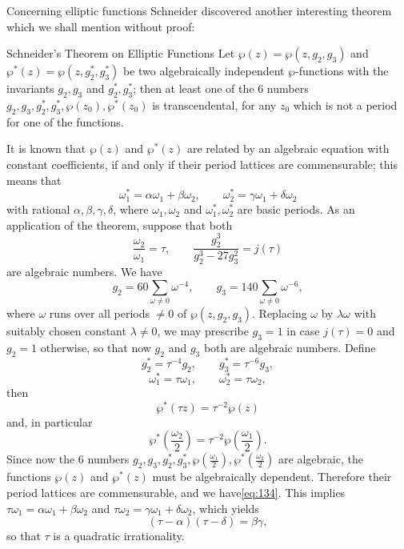 Concerning elliptic functions Schneider discovered another interesting theorem which we shall mention without proof:

\begin{mythm*}{Schneider's Theorem on Elliptic Functions}
Let $\wp(z) = \wp(z, g_2, g_3)$ and $\wp^*(z) = \wp(z, g_2^*, g_3^*)$ be two algebraically independent $\wp$-functions with the invariants $g_2, g_3$ and $g_2^*, g_3^*$; then at least one of the 6 numbers $g_2, g_3, g_2^*, g_3^*, \wp(z_0), \wp^*(z_0)$ is transcendental, for any $z_0$ which is not a period for one of the functions.
\end{mythm*}

It is known that $\wp(z)$ and $\wp^*(z)$ are related by an algebraic equation with constant coefficients, if and only if their period lattices are commensurable; this means that
\begin{equation}
\omega_1^* = \alpha \omega_1 + \beta \omega_2, \qquad \omega_2^* = \gamma \omega_1 + \delta \omega_2 \tag{134}\label{eq:134}
\end{equation}
with rational $\alpha, \beta, \gamma, \delta$, where $\omega_1, \omega_2$ and $\omega_1^*, \omega_2^*$ are basic periods. As an application of the theorem, suppose that both
\[
\frac{\omega_2}{\omega_1} = \tau, \qquad \frac{g_2^3}{g_2^3 - 27g_3^2} = j(\tau)
\]
are algebraic numbers. We have
\[
g_2 = 60 \sum_{\omega \neq 0} \omega^{-4}, \qquad g_3 = 140 \sum_{\omega \neq 0} \omega^{-6},
\]
where $\omega$ runs over all periods $\neq 0$ of $\wp(z, g_2, g_3)$. Replacing $\omega$ by $\lambda\omega$ with suitably chosen constant $\lambda \neq 0$, we may prescribe $g_3=1$ in case $j(\tau)=0$ and $g_2=1$ otherwise, so that now $g_2$ and $g_3$ both are algebraic numbers. Define
\begin{equation}
g_{2}^{*} = \tau^{-4} g_{2}, \qquad g_{3}^{*} = \tau^{-6} g_{3}, \tag{135}\label{eq:135}
\end{equation}
\[
\omega_{1}^{*} = \tau \omega_{1}, \qquad \omega_{2}^{*} = \tau \omega_{2},
\]
then
\[
\wp^*(\tau z) = \tau^{-2} \wp(z)
\]
and, in particular
\[
\wp^*\left(\frac{\omega_2}{2}\right) = \tau^{-2} \wp\left(\frac{\omega_1}{2}\right).
\]
Since now the 6 numbers $g_2, g_3, g_2^*, g_3^*, \wp(\frac{\omega_1}{2}), \wp^*(\frac{\omega_2}{2})$ are algebraic, the functions $\wp(z)$ and $\wp^*(z)$ must be algebraically dependent. Therefore their period lattices are commensurable, and we have\eqref{eq:134}. This implies $\tau \omega_1 = \alpha \omega_1 + \beta \omega_2$ and $\tau \omega_2 = \gamma \omega_1 + \delta \omega_2$, which yields
\[
(\tau - \alpha)(\tau - \delta) = \beta \gamma,
\]
so that $\tau$ is a quadratic irrationality.


